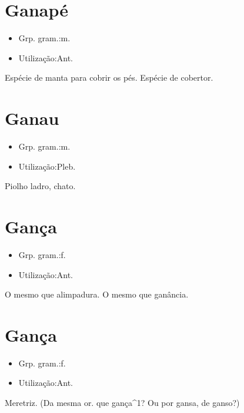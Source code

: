 \section{Ganapé}
\begin{itemize}
\item {Grp. gram.:m.}
\end{itemize}
\begin{itemize}
\item {Utilização:Ant.}
\end{itemize}
Espécie de manta para cobrir os pés.
Espécie de cobertor.
\section{Ganau}
\begin{itemize}
\item {Grp. gram.:m.}
\end{itemize}
\begin{itemize}
\item {Utilização:Pleb.}
\end{itemize}
Piolho ladro, chato.
\section{Gança}
\begin{itemize}
\item {Grp. gram.:f.}
\end{itemize}
\begin{itemize}
\item {Utilização:Ant.}
\end{itemize}
O mesmo que \textunderscore alimpadura\textunderscore .
O mesmo que \textunderscore ganância\textunderscore .
\section{Gança}
\begin{itemize}
\item {Grp. gram.:f.}
\end{itemize}
\begin{itemize}
\item {Utilização:Ant.}
\end{itemize}
Meretriz.
(Da mesma or. que \textunderscore gança\textunderscore ^1? Ou por \textunderscore gansa\textunderscore , de \textunderscore ganso\textunderscore ?)

